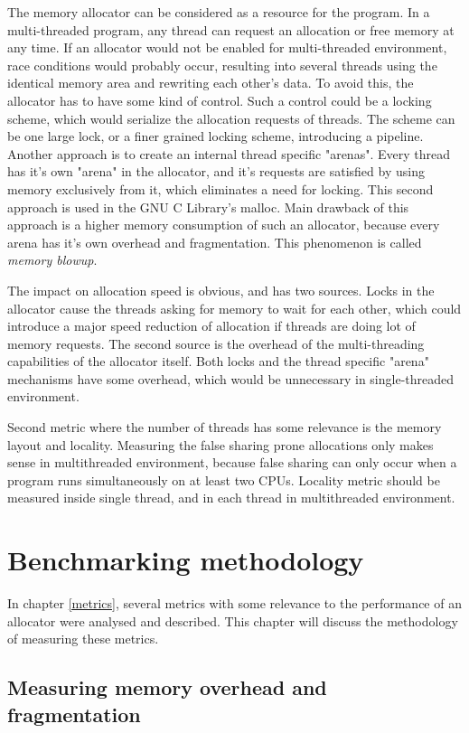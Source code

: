 The memory allocator can be considered as a resource for the program. In a
multi-threaded program, any thread can request an allocation or free memory at
any time. If an allocator would not be enabled for multi-threaded environment,
race conditions would probably occur, resulting into several threads using the
identical memory area and rewriting each other's data. To avoid this, the
allocator has to have some kind of control. Such a control could be a locking
scheme, which would serialize the allocation requests of threads. The scheme can
be one large lock, or a finer grained locking scheme, introducing a pipeline.
Another approach is to create an internal thread specific "arenas". Every thread
has it's own "arena" in the allocator, and it's requests are satisfied by using
memory exclusively from it, which eliminates a need for locking. This second
approach is used in the GNU C Library's malloc. Main drawback of this approach is
a higher memory consumption of such an allocator, because every arena has it's
own overhead and fragmentation. This phenomenon is called {\em memory blowup}.

The impact on allocation speed is obvious, and has two sources. Locks in the
allocator cause the threads asking for memory to wait for each other, which could
introduce a major speed reduction of allocation if threads are doing lot of
memory requests. The second source is the overhead of the multi-threading
capabilities of the allocator itself. Both locks and the thread specific "arena"
mechanisms have some overhead, which would be unnecessary in single-threaded
environment.

Second metric where the number of threads has some relevance is the memory layout
and locality. Measuring the false sharing prone allocations only makes sense in
multithreaded environment, because false sharing can only occur when a program
runs simultaneously on at least two CPUs. Locality metric should be measured
inside single thread, and in each thread in multithreaded environment.

\chapter{Benchmarking methodology}
\label{methodology}

In chapter \ref{metrics}, several metrics with some relevance to the performance
of an allocator were analysed and described. This chapter will discuss the
methodology of measuring these metrics.

\section{Measuring memory overhead and fragmentation}
\label{methodology:fragmentation}

